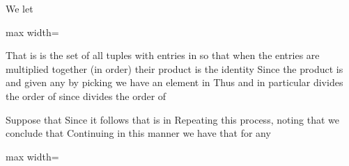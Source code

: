 \documentclass[11pt,oneside]{article}
\begin{document}
\BookNarrativetrue

\begin{BookBody}

 We let

\begin{center}\begin{adjustbox}{max width=\linewidth}\end{adjustbox}\end{center}

\noindent That is is the set of all tuples with entries in  so that when the entries are multiplied together (in order) their product is the identity  Since the product is   and given any  by picking  we have an element in  Thus  and in particular divides the order of  since  divides the order of 

\begingroup\sloppy Suppose that  Since  it follows that  is in  Repeating this process, noting that  we conclude that  Continuing in this manner we have that for any \par\endgroup

\begin{center}\begin{adjustbox}{max width=\linewidth}\end{adjustbox}\end{center}


\end{BookBody}
\end{document}
